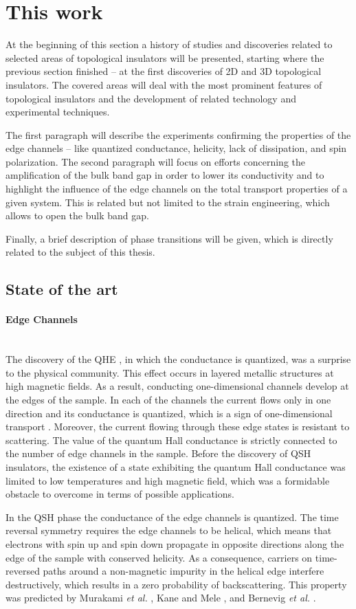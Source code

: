 \documentclass[titlepage,a4paper]{book}
\newcommand{\wciecie}{\quad\phantom{v}}
\newcommand{\myparagraph}[1]{\paragraph{#1}\mbox{}\\}
\begin{document}
\clearpage
\section{This work}
\wciecie
At the beginning of this section a history of studies and discoveries related to selected areas of topological insulators will be presented, starting where the previous section finished -- at the first discoveries of 2D and 3D topological insulators. The covered areas will deal with the most prominent features of topological insulators and the development of related technology and experimental techniques. 

The first paragraph will describe the experiments confirming the properties of the edge channels -- like quantized conductance, helicity, lack of dissipation, and spin polarization. The second paragraph will focus on efforts concerning the amplification of the bulk band gap in order to lower its conductivity and to highlight the influence of the edge channels on the total transport properties of a given system. This is related but not limited to the strain engineering, which allows to open the bulk band gap.

Finally, a brief description of phase transitions will be given, which is directly related to the subject of this thesis. 

\subsection{State of the art}
\myparagraph{Edge Channels}
\wciecie
The discovery of the QHE \cite{Klitzing_Topology}, in which the conductance is quantized, was a surprise to the physical community. This effect occurs in layered metallic structures at high magnetic fields. As a result, conducting one-dimensional channels develop at the edges of the sample. In each of the channels the current flows only in one direction and its conductance is quantized, which is a sign of one-dimensional transport \cite{Halperin_State}. Moreover, the current flowing through these edge states is resistant to scattering. The value of the quantum Hall conductance is strictly connected to the number of edge channels in the sample. Before the discovery of QSH insulators, the existence of a state exhibiting the quantum Hall conductance was limited to low temperatures and high magnetic field, which was a formidable obstacle to overcome in terms of possible applications.
   
In the QSH phase the conductance of the edge channels is quantized. The time reversal symmetry requires the edge channels to be helical, which means that electrons with spin up and spin down propagate in opposite directions along the edge of the sample with conserved helicity. As a consequence, carriers on time-reversed paths around a non-magnetic impurity in the helical edge interfere destructively, which results in a zero probability of backscattering. This property was predicted by Murakami \textit{et al.} \cite{Murakami_State}, Kane and Mele \cite{Kane_Topology}, and Bernevig \textit{et al.} \cite{Bernevig_Topology1}. 
\end{document}
